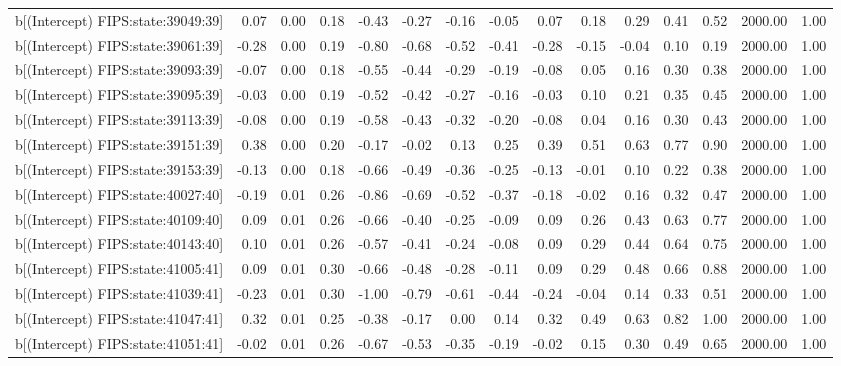\begin{table}[ht]
\begin{tabular}{rrrrrrrrrrrrrrr}
  b[(Intercept) FIPS:state:39049:39] & 0.07 & 0.00 & 0.18 & -0.43 & -0.27 & -0.16 & -0.05 & 0.07 & 0.18 & 0.29 & 0.41 & 0.52 & 2000.00 & 1.00 \\ 
  b[(Intercept) FIPS:state:39061:39] & -0.28 & 0.00 & 0.19 & -0.80 & -0.68 & -0.52 & -0.41 & -0.28 & -0.15 & -0.04 & 0.10 & 0.19 & 2000.00 & 1.00 \\ 
  b[(Intercept) FIPS:state:39093:39] & -0.07 & 0.00 & 0.18 & -0.55 & -0.44 & -0.29 & -0.19 & -0.08 & 0.05 & 0.16 & 0.30 & 0.38 & 2000.00 & 1.00 \\ 
  b[(Intercept) FIPS:state:39095:39] & -0.03 & 0.00 & 0.19 & -0.52 & -0.42 & -0.27 & -0.16 & -0.03 & 0.10 & 0.21 & 0.35 & 0.45 & 2000.00 & 1.00 \\ 
  b[(Intercept) FIPS:state:39113:39] & -0.08 & 0.00 & 0.19 & -0.58 & -0.43 & -0.32 & -0.20 & -0.08 & 0.04 & 0.16 & 0.30 & 0.43 & 2000.00 & 1.00 \\ 
  b[(Intercept) FIPS:state:39151:39] & 0.38 & 0.00 & 0.20 & -0.17 & -0.02 & 0.13 & 0.25 & 0.39 & 0.51 & 0.63 & 0.77 & 0.90 & 2000.00 & 1.00 \\ 
  b[(Intercept) FIPS:state:39153:39] & -0.13 & 0.00 & 0.18 & -0.66 & -0.49 & -0.36 & -0.25 & -0.13 & -0.01 & 0.10 & 0.22 & 0.38 & 2000.00 & 1.00 \\ 
  b[(Intercept) FIPS:state:40027:40] & -0.19 & 0.01 & 0.26 & -0.86 & -0.69 & -0.52 & -0.37 & -0.18 & -0.02 & 0.16 & 0.32 & 0.47 & 2000.00 & 1.00 \\ 
  b[(Intercept) FIPS:state:40109:40] & 0.09 & 0.01 & 0.26 & -0.66 & -0.40 & -0.25 & -0.09 & 0.09 & 0.26 & 0.43 & 0.63 & 0.77 & 2000.00 & 1.00 \\ 
  b[(Intercept) FIPS:state:40143:40] & 0.10 & 0.01 & 0.26 & -0.57 & -0.41 & -0.24 & -0.08 & 0.09 & 0.29 & 0.44 & 0.64 & 0.75 & 2000.00 & 1.00 \\ 
  b[(Intercept) FIPS:state:41005:41] & 0.09 & 0.01 & 0.30 & -0.66 & -0.48 & -0.28 & -0.11 & 0.09 & 0.29 & 0.48 & 0.66 & 0.88 & 2000.00 & 1.00 \\ 
  b[(Intercept) FIPS:state:41039:41] & -0.23 & 0.01 & 0.30 & -1.00 & -0.79 & -0.61 & -0.44 & -0.24 & -0.04 & 0.14 & 0.33 & 0.51 & 2000.00 & 1.00 \\ 
  b[(Intercept) FIPS:state:41047:41] & 0.32 & 0.01 & 0.25 & -0.38 & -0.17 & 0.00 & 0.14 & 0.32 & 0.49 & 0.63 & 0.82 & 1.00 & 2000.00 & 1.00 \\ 
  b[(Intercept) FIPS:state:41051:41] & -0.02 & 0.01 & 0.26 & -0.67 & -0.53 & -0.35 & -0.19 & -0.02 & 0.15 & 0.30 & 0.49 & 0.65 & 2000.00 & 1.00 \\ 

\end{tabular}
\end{table}
